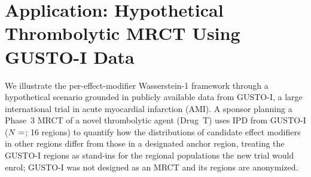 \documentclass[AMA,Times1COL]{WileyNJDv5}
\begin{document}



\section{Application: Hypothetical Thrombolytic MRCT Using GUSTO-I Data}\label{sec:application}

We illustrate the per-effect-modifier Wasserstein-1 framework through a hypothetical scenario grounded in publicly available data from GUSTO-I, a large international trial in acute myocardial infarction (AMI). A sponsor planning a Phase~3 MRCT of a novel thrombolytic agent (Drug~T) uses IPD from GUSTO-I ($N = \numval{gustoN}$; 16 regions)\cite{gusto1993} to quantify how the distributions of candidate effect modifiers in other regions differ from those in a designated anchor region, treating the GUSTO-I regions as stand-ins for the regional populations the new trial would enrol; GUSTO-I was not designed as an MRCT and its regions are anonymized.
\end{document}
